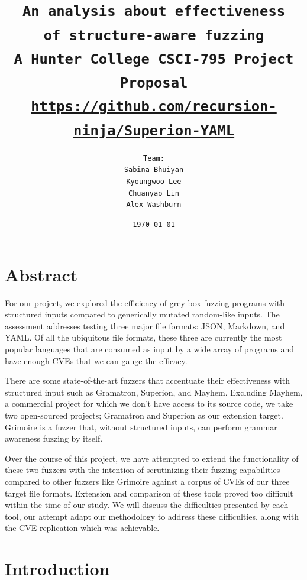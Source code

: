 \documentclass[12pt]{diazessay}
\title{\texttt{\huge{An analysis about effectiveness\\\vspace{-3mm}of structure-aware fuzzing} \\\vspace{-0.35cm} {\large A Hunter College CSCI-795 Project Proposal}\\\normalsize\url{https://github.com/recursion-ninja/Superion-YAML}}} %
\author{\texttt{{\Huge Team:}\\\vspace*{-0.5em} 
		Sabina Bhuiyan \\\vspace*{-0.5em} 
		Kyoungwoo Lee \\\vspace*{-0.5em}
		Chuanyao Lin \\\vspace*{-0.25em}
		Alex Washburn}} %
\date{\texttt{\today}} %
\begin{document}
\maketitle %

\vspace{2cm}
\section*{Abstract}


For our project, we explored the efficiency of grey-box fuzzing programs with structured inputs compared to generically mutated random-like inputs.
The assessment addresses testing three major file formats: JSON, Markdown, and YAML.
Of all the ubiquitous file formats, these three are currently the most popular languages that are consumed as input by a wide array of programs and have enough CVEs that we can gauge the efficacy.

There are some state-of-the-art fuzzers that accentuate their effectiveness with structured input such as Gramatron, Superion, and Mayhem.
Excluding Mayhem, a commercial project for which we don't have access to its source code, we take two open-sourced projects; Gramatron and Superion as our extension target.
Grimoire is a fuzzer that, without structured inputs, can perform grammar awareness fuzzing by itself.

Over the course of this project, we have attempted to extend the functionality of these two fuzzers with the intention of scrutinizing their fuzzing capabilities compared to other fuzzers like Grimoire against a corpus of CVEs of our three target file formats.
Extension and comparison of these tools proved too difficult within the time of our study.
We will discuss the difficulties presented by each tool, our attempt adapt our methodology to address these difficulties, along with the CVE replication which was achievable.

\clearpage

\section*{Introduction}
\end{document}
